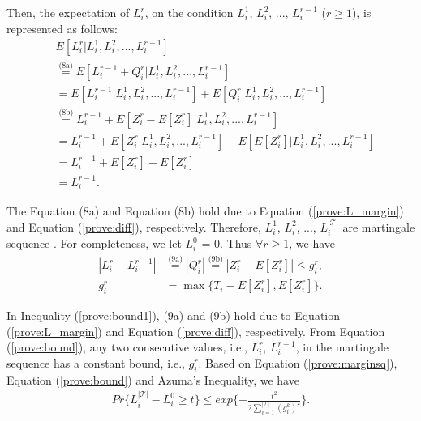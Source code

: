 \documentclass[conference]{IEEEtran}
\begin{document}
Then, the expectation of $L_i^{r}$, on the condition $L_i^{1}$, $L_i^{2}$, ..., $L_i^{r-1}$ ($r \geq 1$), is represented as follows:
\vspace{-0.1cm}
\begin{align}
&E[L_i^{r}|L_i^{1}, L_i^{2}, ..., L_i^{r-1}] \nonumber\\
&\overset{\text{(8a)}}{=}E[L_i^{r-1} + Q_i^{r} |L_i^{1}, L_i^{2}, ..., L_i^{r-1}] \nonumber\\
&\overset{\text{}}{=}E[L_i^{r-1} |L_i^{1}, L_i^{2}, ..., L_i^{r-1}]
+ E[Q_i^{r} |L_i^{1}, L_i^{2}, ..., L_i^{r-1}] \nonumber\\
&\overset{\text{(8b)}}{=}L_i^{r-1} + E[Z_i^r - E[Z_i^r] |L_i^{1}, L_i^{2}, ..., L_i^{r-1}]\nonumber\\
&=L_i^{r-1} + E[Z_i^r|L_i^{1}, L_i^{2}, ..., L_i^{r-1}]
-E[E[Z_i^r] |L_i^{1}, L_i^{2}, ..., L_i^{r-1}]\nonumber\\
&=L_i^{r-1} + E[Z_i^r] - E[Z_i^r]\nonumber\\
&=L_i^{r-1}.\label{prove:marginsq}
\end{align}

\vspace{-0.2cm}
The Equation (8a) and Equation (8b) hold due to Equation (\ref{prove:L_margin}) and Equation (\ref{prove:diff}), respectively. Therefore, $L_i^{1}$, $L_i^{2}$, ..., $L_i^{|\mathcal{T}|}$ are martingale sequence \cite{b13}. For completeness, we let $L_i^{0}$ = 0. Thus $\forall r \geq 1$, we have
\vspace{-0.2cm}
\begin{align}
  |L_i^r - L_i^{r-1}|&\overset{\text{(9a)}}{=} |Q_i^{r}| \overset{\text{(9b)}}{=} |Z_i^r - E[Z_i^r]|\leq g_i^r, \label{prove:bound1}\\
  g_i^r &= \max\{T_i -  E[Z_i^r], E[Z_i^r]\}.\label{prove:bound}
\end{align}

\vspace{-0.15cm}
In Inequality (\ref{prove:bound1}), (9a) and (9b) hold due to Equation (\ref{prove:L_margin}) and Equation (\ref{prove:diff}), respectively. From Equation (\ref{prove:bound}), any two consecutive values, i.e., $L_i^r$, $L_i^{r-1}$, in the martingale sequence has a constant bound, i.e., $g_i^r$. Based on Equation (\ref{prove:marginsq}), Equation (\ref{prove:bound}) and Azuma's Inequality, we have
\vspace{-0.3cm}
\begin{align}
Pr\{L_i^{|\mathcal{T}|} - L_i^{0} \geq t\} \leq exp\{-\frac{t^2}{2\sum_{ i = 1 }^{|\mathcal{T}|}(g_i^k)^2}\}. \label{prove:azuma}
\end{align}
\end{document}
